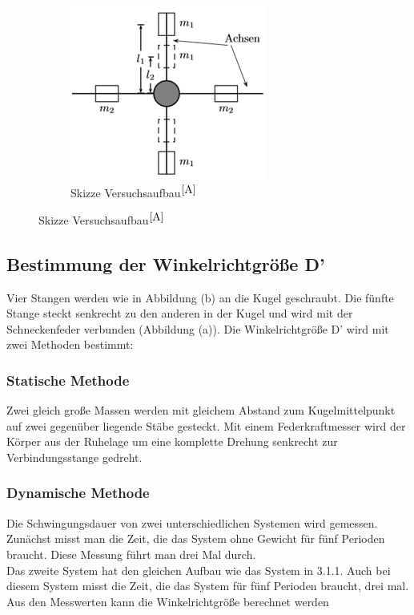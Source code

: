 \documentclass[fontsize=12pt]{scrartcl}
\begin{document}
\begin{figure}[H]
\begin{subfigure}[H]{0.4\textwidth}
                \includegraphics[width=\textwidth]{Graphik/Versuchsaufbau2}
                \caption{Skizze Versuchsaufbau$^{\cite{A}}$}
        \end{subfigure}
\end{figure}
\noindent
\newpage
\subsection{Bestimmung der Winkelrichtgröße D'} 
Vier Stangen werden wie in Abbildung (b) an die Kugel geschraubt. Die fünfte Stange steckt senkrecht zu den anderen in der Kugel und wird mit der Schneckenfeder verbunden (Abbildung (a)).
Die Winkelrichtgröße D' wird mit zwei Methoden bestimmt:

\subsubsection{Statische Methode}
Zwei gleich große Massen werden mit gleichem Abstand zum Kugelmittelpunkt auf zwei gegenüber liegende Stäbe gesteckt. Mit einem Federkraftmesser wird der Körper aus der Ruhelage um eine komplette Drehung senkrecht zur Verbindungsstange gedreht.

\subsubsection{Dynamische Methode}
Die Schwingungsdauer von zwei unterschiedlichen Systemen wird gemessen. Zunächst misst man die Zeit, die das System ohne Gewicht für fünf Perioden braucht. Diese Messung führt man drei Mal durch.  \\
Das zweite System hat den gleichen Aufbau wie das System in 3.1.1. Auch bei diesem System misst die Zeit, die das System für fünf Perioden braucht, drei mal. Aus den Messwerten kann die Winkelrichtgröße berechnet werden
\end{document}
